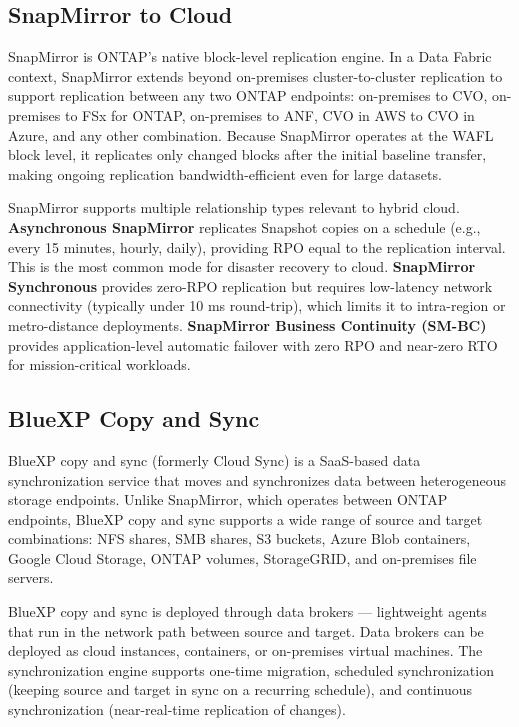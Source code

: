 \subsection{SnapMirror to Cloud}

SnapMirror is ONTAP's native block-level replication engine. In a Data Fabric context, SnapMirror extends beyond on-premises cluster-to-cluster replication to support replication between any two ONTAP endpoints: on-premises to CVO, on-premises to FSx for ONTAP, on-premises to ANF, CVO in AWS to CVO in Azure, and any other combination. Because SnapMirror operates at the WAFL block level, it replicates only changed blocks after the initial baseline transfer, making ongoing replication bandwidth-efficient even for large datasets.

SnapMirror supports multiple relationship types relevant to hybrid cloud. \textbf{Asynchronous SnapMirror} replicates Snapshot copies on a schedule (e.g., every 15 minutes, hourly, daily), providing RPO equal to the replication interval. This is the most common mode for disaster recovery to cloud. \textbf{SnapMirror Synchronous} provides zero-RPO replication but requires low-latency network connectivity (typically under 10 ms round-trip), which limits it to intra-region or metro-distance deployments. \textbf{SnapMirror Business Continuity (SM-BC)} provides application-level automatic failover with zero RPO and near-zero RTO for mission-critical workloads.

\subsection{BlueXP Copy and Sync}

BlueXP copy and sync (formerly Cloud Sync) is a SaaS-based data synchronization service that moves and synchronizes data between heterogeneous storage endpoints. Unlike SnapMirror, which operates between ONTAP endpoints, BlueXP copy and sync supports a wide range of source and target combinations: NFS shares, SMB shares, S3 buckets, Azure Blob containers, Google Cloud Storage, ONTAP volumes, StorageGRID, and on-premises file servers.

BlueXP copy and sync is deployed through data brokers --- lightweight agents that run in the network path between source and target. Data brokers can be deployed as cloud instances, containers, or on-premises virtual machines. The synchronization engine supports one-time migration, scheduled synchronization (keeping source and target in sync on a recurring schedule), and continuous synchronization (near-real-time replication of changes).

